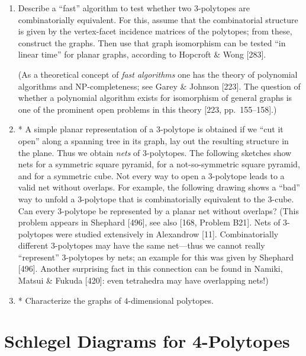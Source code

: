 \documentclass{article}
\begin{document}
\begin{enumerate}
\item Describe a ``fast'' algorithm to test whether two $3$-polytopes are combinatorially equivalent. For this, assume that the combinatorial structure is given by the vertex-facet incidence matrices of the polytopes; from these, construct the graphs. Then use that graph isomorphism can be tested ``in linear time'' for planar graphs, according to Hopcroft \& Wong [283].

(As a theoretical concept of \emph{fast algorithms} one has the theory of polynomial algorithms and NP-completeness; see Garey \& Johnson [223]. The question of whether a polynomial algorithm exists for isomorphism of general graphs is one of the prominent open problems in this theory [223, pp.\ 155--158].)

\item* A simple planar representation of a $3$-polytope is obtained if we ``cut it open'' along a spanning tree in its graph, lay out the resulting structure in the plane. Thus we obtain \emph{nets} of $3$-polytopes. The following sketches show nets for a symmetric square pyramid, for a not-so-symmetric square pyramid, and for a symmetric cube. Not every way to open a $3$-polytope leads to a valid net without overlaps. For example, the following drawing shows a ``bad'' way to unfold a $3$-polytope that is combinatorially equivalent to the $3$-cube. Can every $3$-polytope be represented by a planar net without overlaps? (This problem appears in Shephard [496], see also [168, Problem B21]. Nets of $3$-polytopes were studied extensively in Alexandrow [11]. Combinatorially different $3$-polytopes may have the same net---thus we cannot really ``represent'' $3$-polytopes by nets; an example for this was given by Shephard [496]. Another surprising fact in this connection can be found in Namiki, Matsui \& Fukuda [420]: even tetrahedra may have overlapping nets!)

\item* Characterize the graphs of $4$-dimensional polytopes.

\end{enumerate}

\bigskip
\section{Schlegel Diagrams for 4-Polytopes}
\end{document}
